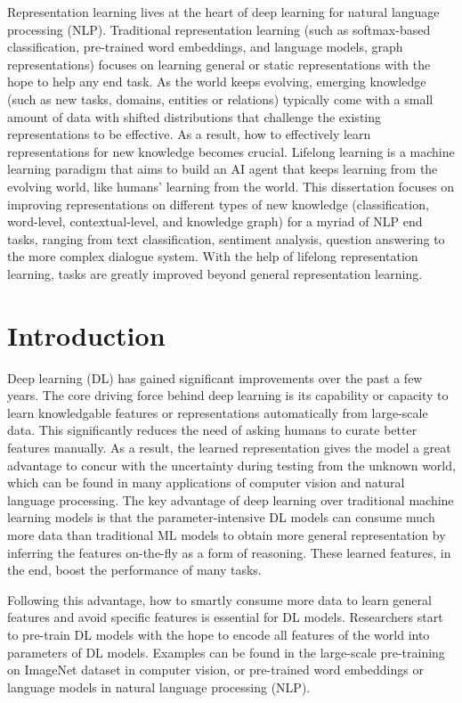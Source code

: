 \summary
Representation learning lives at the heart of deep learning for natural language processing (NLP). 
Traditional representation learning (such as softmax-based classification, pre-trained word embeddings, and language models, graph representations) focuses on learning general or static representations with the hope to help any end task.
As the world keeps evolving, emerging knowledge (such as new tasks, domains, entities or relations) typically come with a small amount of data with shifted distributions that challenge the existing representations to be effective.
As a result, how to effectively learn representations for new knowledge becomes crucial.
Lifelong learning is a machine learning paradigm that aims to build an AI agent that keeps learning from the evolving world, like humans' learning from the world.
This dissertation focuses on improving representations on different types of new knowledge (classification, word-level, contextual-level, and knowledge graph) for a myriad of NLP end tasks, ranging from text classification, sentiment analysis, question answering to the more complex dialogue system.
With the help of lifelong representation learning, tasks are greatly improved beyond general representation learning.

\chapter{Introduction}
\label{chap1:intro}

Deep learning (DL) has gained significant improvements over the past a few years\cite{Goodfellow-et-al-2016-Book}. 
The core driving force behind deep learning is its capability or capacity to learn knowledgable features or representations automatically from large-scale data.
This significantly reduces the need of asking humans to curate better features manually.
As a result, the learned representation gives the model a great advantage to concur with the uncertainty during testing from the unknown world, which can be found in many applications of computer vision and natural language processing.
The key advantage of deep learning over traditional machine learning models is that the parameter-intensive DL models can consume much more data than traditional ML models to obtain more general representation by inferring the features on-the-fly as a form of reasoning. These learned features, in the end, boost the performance of many tasks.

Following this advantage, how to smartly consume more data to learn general features and avoid specific features is essential for DL models.
Researchers start to pre-train DL models with the hope to encode all features of the world into parameters of DL models.
Examples can be found in the large-scale pre-training on ImageNet dataset \cite{deng2009imagenet,russakovsky2015imagenet,krizhevsky2012imagenet} in computer vision, or pre-trained word embeddings or language models \cite{peters2018deep,devlin2018bert} in natural language processing (NLP).

